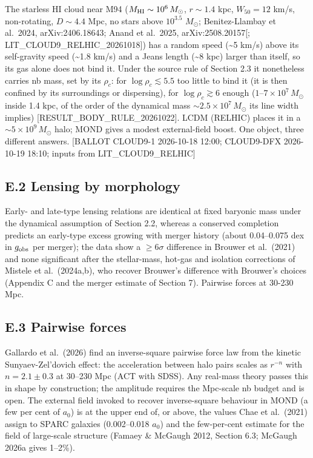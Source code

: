 \documentclass[
  10pt,
]{article}
\begin{document}
The starless HI cloud near M94 ($M_{\rm HI}\sim10^6\,M_\odot$, $r\sim1.4$ kpc, $W_{50}=12$ km/s, non-rotating,
$D\sim4.4$ Mpc, no stars above $10^{3.5}$ $M_\odot$;
Benitez-Llambay et al.~2024, arXiv:2406.18643; Anand et al.~2025,
arXiv:2508.20157{[}; LIT\_CLOUD9\_RELHIC\_20261018{]}) has a random
speed (\textasciitilde{}5 km/s) above its self-gravity speed
(\textasciitilde{}1.8 km/s) and a Jeans length (\textasciitilde{}8 kpc)
larger than itself, so its gas alone does not bind it. Under the source rule of
Section 2.3 it nonetheless carries nb mass, set by its $\rho_c$: for
$\log\rho_c\lesssim5.5$ too little to bind it (it is then confined by its
surroundings or dispersing), for $\log\rho_c\gtrsim6$ enough
($1$--$7\times10^7\,M_\odot$ inside 1.4 kpc, of the order of the dynamical mass
$\sim2.5\times10^7\,M_\odot$ its line width implies)
{[}RESULT\_BODY\_RULE\_20261022{]}. LCDM (RELHIC) places it in a
$\sim5\times10^9\,M_\odot$ halo; MOND gives a modest external-field boost.
One object, three different answers. {[}BALLOT CLOUD9-1 2026-10-18
12:00; CLOUD9-DFX 2026-10-19 18:10; inputs from LIT\_CLOUD9\_RELHIC{]}

\subsection{E.2 Lensing by morphology}

Early- and late-type lensing relations are identical at fixed baryonic mass under the dynamical assumption of Section 2.2, whereas a conserved completion predicts an early-type excess growing with merger history (about 0.04--0.075 dex in $g_{\rm obs}$ per merger); the data show a $\ge6\sigma$ difference in Brouwer et al.~(2021) and none significant after the stellar-mass, hot-gas and isolation corrections of Mistele et al.~(2024a,b), who recover Brouwer's difference with Brouwer's choices (Appendix C and the merger estimate of Section 7). Pairwise forces at 30-230 Mpc.

\subsection{E.3 Pairwise forces}

Gallardo et al.~(2026) find an inverse-square pairwise force law from the kinetic Sunyaev-Zel'dovich effect: the acceleration between halo pairs scales as $r^{-n}$ with $n=2.1\pm0.3$ at 30--230 Mpc (ACT with SDSS). Any real-mass theory passes this
in shape by construction; the amplitude requires the Mpc-scale nb budget
and is open. The external field invoked to recover inverse-square behaviour in MOND (a few per cent of $a_0$) is at the upper end of, or above, the values Chae et al.~(2021) assign to SPARC galaxies (0.002--0.018 $a_0$) and the few-per-cent estimate for the field of large-scale structure (Famaey \& McGaugh 2012, Section 6.3; McGaugh 2026a gives 1--2\%).
\end{document}
